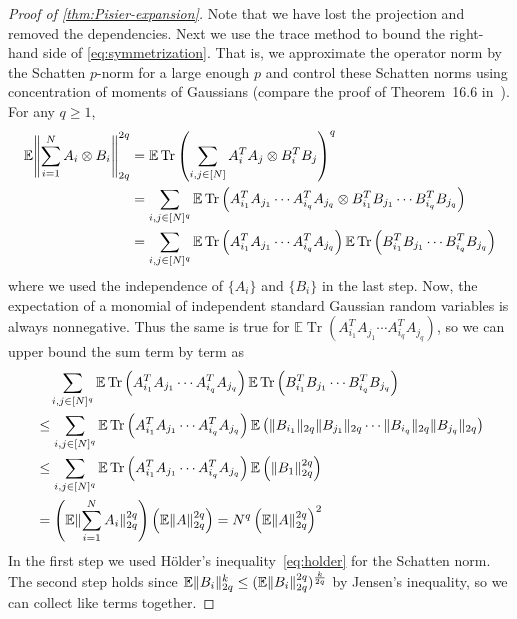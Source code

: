 \documentclass[aos]{imsart}
\theoremstyle{definition}
\numberwithin{equation}{section}
\DeclareMathOperator{\tr}{Tr}
\DeclarePairedDelimiter{\norm}{\lVert}{\rVert}
\newcommand{\ot}{\otimes}
\newcommand{\E}{\mathbb{E}}
\begin{document}
\begin{appendix}
\begin{proof} [Proof of \cref{thm:Pisier-expansion}]
Note that we have lost the projection and removed the dependencies.
Next we use the trace method to bound the right-hand side of \cref{eq:symmetrization}.
That is, we approximate the operator norm by the Schatten $p$-norm for a large enough $p$ and control these Schatten norms using concentration of moments of Gaussians (compare the proof of Theorem~16.6 in~\cite{pisier2012grothendieck}).
For any $q\geq1$,
\begin{align*}
\E \norm*{\sum_{i=1}^N A_i \ot B_i}_{2q}^{2q}
&= \E \tr \left( \sum_{i,j\in[N]} A_i^T A_j \ot B_i^T B_j \right)^q \\
&= \sum_{i, j \in [N]^q} \E \tr \left( A^T_{i_1} A_{j_1} \cdots A^T_{i_q} A_{j_q} \ot B^T_{i_1} B_{j_1} \cdots B^T_{i_q} B_{j_q} \right) \\
&= \sum_{i, j \in [N]^q} \E \tr \left( A^T_{i_1} A_{j_1} \cdots A^T_{i_q} A_{j_q} \right) \E \tr \left( B^T_{i_1} B_{j_1} \cdots B^T_{i_q} B_{j_q} \right)
\end{align*}
where we used the independence of $\{A_i\}$ and $\{B_i\}$ in the last step.
Now, the expectation of a monomial of independent standard Gaussian random variables is always nonnegative.
Thus the same is true for $\E \tr ( A^T_{i_1} A_{j_1} \cdots A^T_{i_q} A_{j_q} )$, so we can upper bound the sum term by term as
\begin{align*}
&\quad \sum_{i, j \in [N]^q} \E \tr \left( A^T_{i_1} A_{j_1} \cdots A^T_{i_q} A_{j_q} \right) \E \tr \left( B^T_{i_1} B_{j_1} \cdots B^T_{i_q} B_{j_q} \right) \\
&\leq \sum_{i, j \in [N]^q} \E \tr \left( A^T_{i_1} A_{j_1} \cdots A^T_{i_q} A_{j_q} \right) \E \left( \norm{ B_{i_1} }_{2q} \norm{B_{j_1}}_{2q} \cdots \norm{ B_{i_q} }_{2q} \norm{B_{j_q}}_{2q} \right) \\
&\leq \sum_{i, j \in [N]^q} \E \tr \left( A^T_{i_1} A_{j_1} \cdots A^T_{i_q} A_{j_q} \right) \E \left( \norm{ B_1 }_{2q}^{2q} \right) \\
&= \left( \E\norm{\sum_{i=1}^N A_i}_{2q}^{2q} \right) \left( \E \norm{ A }_{2q}^{2q} \right)
= N^q \left( \E\norm{A}_{2q}^{2q} \right)^2
\end{align*}
In the first step we used H\"older's inequality~\eqref{eq:holder} for the Schatten norm.
The second step holds since $\E\norm{B_i}_{2q}^k \leq (\E \norm{B_i}_{2q}^{2q})^{\frac k {2q}}$ by Jensen's inequality, so we can collect like terms together.

\end{proof}
\end{appendix}
\end{document}
